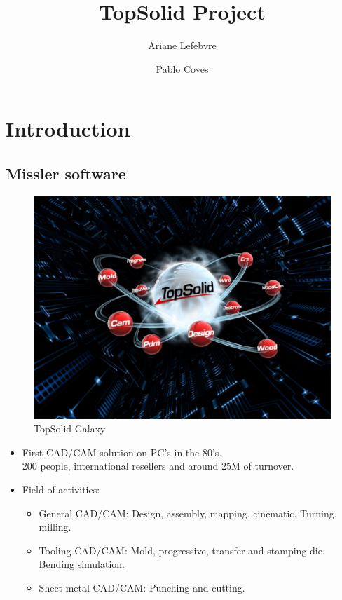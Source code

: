 \documentclass{beamer}
\title{TopSolid Project}
\author{Ariane Lefebvre \and Pablo Coves}
\date{}
\begin{document}
\maketitle

\section{Introduction}
\subsection{Missler software}
\begin{frame}
    \begin{figure}
        \includegraphics[width=.8\textwidth]{img/topSolid.jpg}
        \caption{TopSolid Galaxy}
        \label{TopSolid}
    \end{figure}
\end{frame}
\begin{frame}
    \begin{itemize}
        \item First CAD/CAM solution on PC's in the 80's.\\
            200 people, international resellers and around 25M of turnover.
        \item Field of activities:
            \begin{itemize}
                \item General CAD/CAM:
                    Design, assembly, mapping, cinematic.
                    Turning, milling.
                \item Tooling CAD/CAM:
                    Mold, progressive, transfer and stamping die.
                    Bending simulation.
                \item Sheet metal CAD/CAM:
                    Punching and cutting.
            \end{itemize}
    \end{itemize}
\end{frame}
\end{document}
